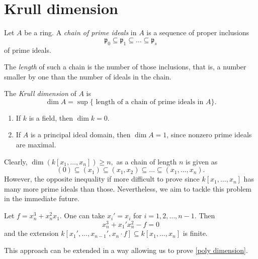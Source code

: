 \section{Krull dimension}

\begin{df}
  Let $A$ be a ring. A \textit{chain of prime ideals} in $A$ is a sequence of proper inclusions
  \[ \mathfrak p_0 \subseteq \mathfrak p_1 \subseteq \dotso \subseteq \mathfrak p_s\]
  of prime ideals.

  The \textit{length} of such a chain is the number of those inclusions, that is, a number smaller by one than the number of ideals in the chain.
\end{df}

\begin{df}
  The \textit{Krull dimension} of $A$ is
  \[ \dim A = \sup \{ \text{ length of a chain of prime ideals in $A$} \}.\]
\end{df}

\begin{example}
  \mbox{}
  \begin{enumerate}
  \item If $k$ is a field, then $\dim k = 0$.
  \item If $A$ is a principal ideal domain, then $\dim A = 1$, since nonzero prime ideals are maximal.
  \end{enumerate}
\end{example}

Clearly, \(\dim(k[x_1, \dotsc, x_n]) \geq n,\) as a chain of length $n$ is given as
\[ (0) \subseteq (x_1) \subseteq (x_1, x_2) \subseteq \dotso \subseteq (x_1, \dotsc, x_n).\]
However, the opposite inequality if more difficult to prove since $k[x_1, \dotsc, x_n]$ has many more prime ideals than those. Nevertheless, we aim to tackle this problem in the immediate future.

\begin{example}
  Let $f = x_n^3 + x_n^2 x_1$. One can take $x_i' = x_i$ for $i=1, 2, \dotsc, n-1$. Then
  \[ x_n^3 + x_1' x_n^2 - f = 0\]
  and the extension $k[x_1', \dotsc, x_{n-1}', x_n \cdot f] \subseteq k[x_1, \dotsc, x_n]$ is finite.
\end{example}

This approach can be extended in a way allowing us to prove \cref{poly dimension}.


